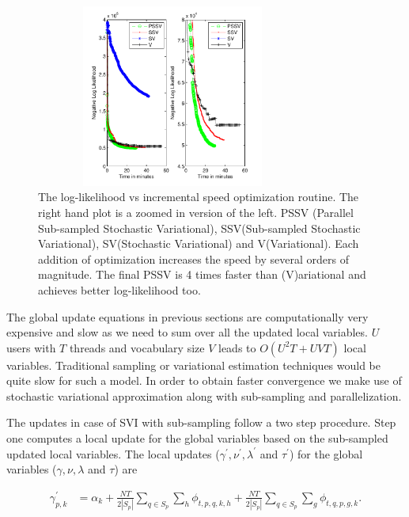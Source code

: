 \documentclass{sig-alternate}
\begin{document}
\begin{figure}
\begin{center}
\includegraphics[height=6cm,width=9cm]{SpeedOptimization.pdf}
\end{center}
\caption{The log-likelihood vs incremental speed optimization routine. 
The right hand plot is a zoomed in version of the left. PSSV
(Parallel Sub-sampled Stochastic Variational), SSV(Sub-sampled Stochastic
Variational), SV(Stochastic Variational) and V(Variational). Each addition of
optimization increases the speed by several orders of magnitude. The final PSSV
is 4 times faster than (V)ariational and achieves better log-likelihood too.}
\label{fig:SpeedOptimization}
\end{figure}
The global update equations in previous sections are computationally
very expensive and slow as we need to sum over all the updated local
variables. $U$ users with $T$ threads and vocabulary size $V$ leads to
$O(U^2T+UVT)$ local variables. Traditional sampling or 
variational estimation techniques would be
quite slow for such a model. In order to obtain faster convergence we
make use of stochastic variational approximation along with
sub-sampling and parallelization. 

The updates in case of SVI with sub-sampling follow a two step procedure. Step
one computes a local update for the global variables based on the sub-sampled
updated local variables. The local updates ($\gamma^{'},
\nu^{'}, \lambda^{'}$ and $\tau^{'}$) for the global variables ($\gamma,
\nu, \lambda$ and $\tau$) are

\begin{align}
\gamma_{p,k}^{'} &= \alpha_{k} + \frac{NT}{2|S_p|}\sum_{q \in S_p} \sum_{h}
\! \phi_{t,p,q,k,h} + \frac{NT}{2|S_p|}\sum_{q \in S_p} \! \sum_{g} \!
\phi_{t,q,p,g,k}. 
\label{eqn:gammaUpStoc}
\end{align}
  
\end{document}
